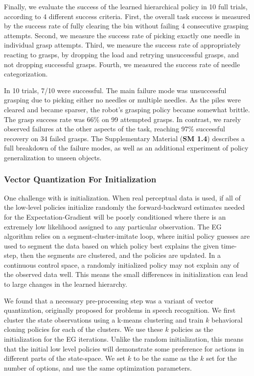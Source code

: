 Finally, we evaluate the success of the learned hierarchical policy in 10 full trials, according to 4 different success criteria. First, the overall task success is measured by the success rate of fully clearing the bin without failing 4 consecutive grasping attempts. Second, we measure the success rate of picking exactly one needle in individual grasp attempts. Third, we measure the success rate of appropriately reacting to grasps, by dropping the load and retrying unsuccessful grasps, and not dropping successful grasps. Fourth, we measured the success rate of needle categorization.

In 10 trials, 7/10 were successful. The main failure mode was unsuccessful grasping due to picking either no needles or multiple needles. As the piles were cleared and became sparser, the robot's grasping policy became somewhat brittle. The grasp success rate was 66\% on 99 attempted grasps. In contrast, we rarely observed failures at the other aspects of the task, reaching 97\% successful recovery on 34 failed grasps. The Supplementary Material (\textbf{SM 1.4}) describes a full breakdown of the failure modes, as well as an additional experiment of policy generalization to unseen objects.


\subsubsection{Vector Quantization For Initialization}
One challenge with \alg is initialization.
When real perceptual data is used, if all of the low-level policies initialize randomly the forward-backward estimates needed for the Expectation-Gradient will be poorly conditioned where there is an extremely low likelihood assigned to any particular observation.
The EG algorithm relies on a segment-cluster-imitate loop, where initial policy guesses are used to segment the data based on which policy best explains the given time-step, then the segments are clustered, and the policies are updated.
In a continuous control space, a randomly initialized policy may not explain any of the observed data well.
This means the small differences in initialization can lead to large changes in the learned hierarchy.

We found that a necessary pre-processing step was a variant of vector quantization, originally proposed for problems in speech recognition. 
We first cluster the state observations using a \textsf{k-means} clustering and train $k$ behavioral cloning policies for each of the clusters.
We use these $k$ policies as the initialization for the EG iterations.
Unlike the random initialization, this means that the initial low level policies will demonstrate some preference for actions in different parts of the state-space.
We set $k$ to be the same as the $k$ set for the number of options, and use the same optimization parameters.

